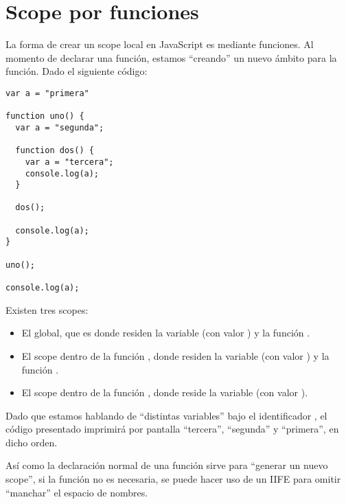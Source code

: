 \section{Scope por funciones}
\label{sec:scopefunciones}

La forma de crear un scope local en JavaScript es mediante funciones. Al momento de declarar una función, estamos "`creando"' un nuevo ámbito para la función. Dado el siguiente código:

\begin{lstlisting}
var a = "primera"

function uno() {
  var a = "segunda";

  function dos() {
    var a = "tercera";
    console.log(a);
  }

  dos();

  console.log(a);
}

uno();

console.log(a);
\end{lstlisting}

Existen tres scopes: 
\begin{itemize} 
\item El global, que es donde residen la variable  (con valor ) y la función .
\item El scope dentro de la función , donde residen la variable  (con valor ) y la función .
\item El scope dentro de la función , donde reside la variable  (con valor ).
\end{itemize}

Dado que estamos hablando de "`distintas variables"' bajo el identificador , el código presentado imprimirá por pantalla "`tercera"', "`segunda"' y "`primera"', en dicho orden.

Así como la declaración normal de una función sirve para "`generar un nuevo scope"', si la función no es necesaria, se puede hacer uso de un IIFE para omitir "`manchar"' el espacio de nombres.